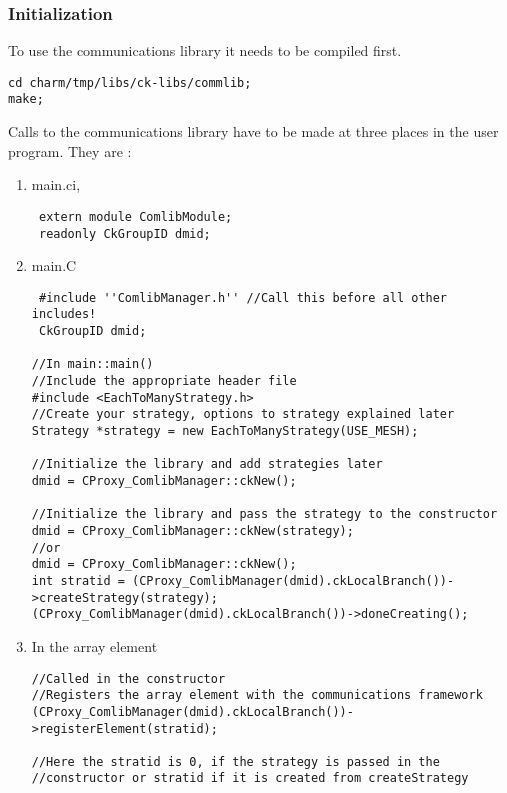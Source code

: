 \subsubsection{Initialization}

To use the communications library it needs to be compiled first.

\begin{verbatim}
cd charm/tmp/libs/ck-libs/commlib;
make;
\end{verbatim}

Calls to the communications library have to be made at three places in
the user program. They are :

\begin{enumerate}

\item main.ci, \\
\begin{verbatim}
 extern module ComlibModule; 
 readonly CkGroupID dmid; 
\end{verbatim}

\item main.C \\
\begin{verbatim}
 #include ''ComlibManager.h'' //Call this before all other includes!
 CkGroupID dmid; 

//In main::main() 
//Include the appropriate header file
#include <EachToManyStrategy.h>
//Create your strategy, options to strategy explained later
Strategy *strategy = new EachToManyStrategy(USE_MESH);

//Initialize the library and add strategies later
dmid = CProxy_ComlibManager::ckNew(); 

//Initialize the library and pass the strategy to the constructor
dmid = CProxy_ComlibManager::ckNew(strategy); 
//or 
dmid = CProxy_ComlibManager::ckNew(); 
int stratid = (CProxy_ComlibManager(dmid).ckLocalBranch())->createStrategy(strategy);
(CProxy_ComlibManager(dmid).ckLocalBranch())->doneCreating();
\end{verbatim}

\item In the array element \\
\begin{verbatim}
//Called in the constructor
//Registers the array element with the communications framework
(CProxy_ComlibManager(dmid).ckLocalBranch())->registerElement(stratid);

//Here the stratid is 0, if the strategy is passed in the 
//constructor or stratid if it is created from createStrategy


\end{verbatim}
\end{enumerate}
